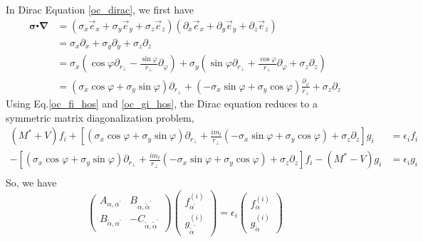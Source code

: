   In Dirac Equation \eqref{oc_dirac}, we first have
  \begin{equation}
    \begin{aligned}
      \boldsymbol{\sigma} \centerdot \boldsymbol{\nabla} &= (\sigma_x \vec{e}_x + \sigma_y \vec{e}_y + \sigma_z\vec{e}_z )(\partial_x\vec{e}_x + \partial_y \vec{e}_y + \partial_z\vec{e}_z ) \\
      &= \sigma_x\partial_x + \sigma_y\partial_y + \sigma_z\partial_z \\
      &= \sigma_x\left( \cos\varphi \partial_{r_{\perp}} - \frac{\sin\varphi}{r_{\perp}} \partial_{\varphi}  \right) + \sigma_y\left( \sin\varphi\partial_{r_{\perp}} + \frac{\cos\varphi}{r_{\perp}}\partial_{\varphi} + \sigma_z\partial_z \right) \\
      &= (\sigma_x\cos\varphi + \sigma_y\sin\varphi) \partial_{r_{\perp}} + (-\sigma_x\sin\varphi + \sigma_y\cos\varphi)\frac{\partial_{\varphi}}{r_{\perp}} + \sigma_z\partial_z
    \end{aligned}
  \end{equation}
  Using Eq.\eqref{oc_fi_hos} and \eqref{oc_gi_hos}, the Dirac equation reduces to a symmetric matrix diagonalization problem, 
  \begin{equation}
    \begin{aligned}
      (M^* + V)f_i + \left[ (\sigma_x\cos\varphi + \sigma_y\sin\varphi)\partial_{r_{\perp}} + \frac{im_l}{r_{\perp}}(-\sigma_x\sin\varphi + \sigma_y\cos\varphi) + \sigma_z\partial_z \right] g_i &= \epsilon_i f_i \\
      -\left[ (\sigma_x\cos\varphi + \sigma_y\sin\varphi)\partial_{r_{\perp}} + \frac{im_l}{r_{\perp}}(-\sigma_x\sin\varphi + \sigma_y\cos\varphi) + \sigma_z\partial_z \right] f_i - (M^* - V)g_i &= \epsilon_i g_i \\
    \end{aligned}
  \end{equation}
  So, we have
  \begin{equation}
    \left(\begin{array}{cc}
      A_{\alpha, \alpha^{\prime}}         & B_{\alpha, \tilde{\alpha}^{\prime}} \\
      B_{\tilde{\alpha}, \alpha^{\prime}} & -C_{\tilde{\alpha}, \tilde{\alpha}^{\prime}}
      \end{array}\right)
      \left(\begin{array}{l}
        f_{\alpha^{\prime}}^{(i)} \\
        g_{\tilde{\alpha}^{\prime}}^{(i)}
      \end{array}\right)
      =\epsilon_{i}
      \left(\begin{array}{c}
        f_{\alpha}^{(i)} \\
        g_{\tilde{\alpha}}^{(i)}
      \end{array}\right)
  \end{equation}
